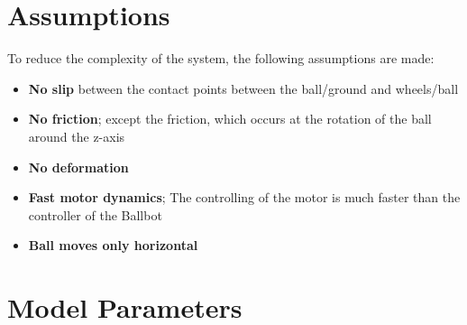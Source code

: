 \documentclass[twoside,colorback,accentcolor=tud4c,11pt]{tudreport}
\begin{document}
	\section{Assumptions}
	
	To reduce the complexity of the system, the following assumptions are made: 
	
	\begin{itemize}
		\item \textbf{No slip} between the contact points between the ball/ground and wheels/ball
		\item \textbf{No friction}; except the friction, which occurs at the rotation of the ball around the z-axis
		\item \textbf{No deformation}
		\item \textbf{Fast motor dynamics}; The controlling of the motor is much faster than the controller of the Ballbot
		\item \textbf{Ball moves only horizontal}
	\end{itemize}
	
	\section{Model Parameters}
	
\end{document}
